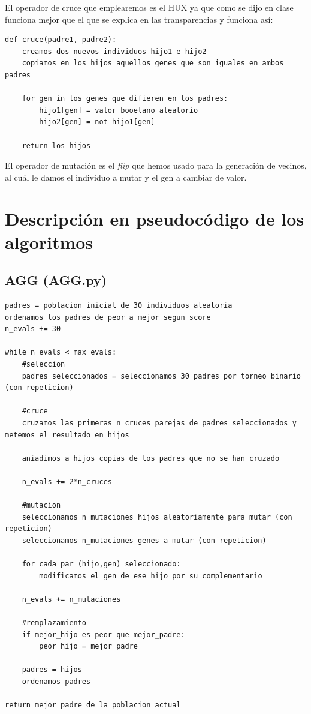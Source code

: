 \documentclass[10pt,a4paper]{article}
\begin{document}
El operador de cruce que emplearemos es el HUX ya que como se dijo en clase funciona mejor que el que se explica en las transparencias y funciona así:\\

\begin{lstlisting}
def cruce(padre1, padre2):
	creamos dos nuevos individuos hijo1 e hijo2
	copiamos en los hijos aquellos genes que son iguales en ambos padres
	
	for gen in los genes que difieren en los padres:
		hijo1[gen] = valor booelano aleatorio
		hijo2[gen] = not hijo1[gen]
		
	return los hijos		
\end{lstlisting}

El operador de mutación es el \textit{flip} que hemos usado para la generación de vecinos, al cuál le damos el individuo a mutar y el gen a cambiar de valor.\\

\newpage

\section{\color[rgb]{0.0,0.0,0.21}Descripción en pseudocódigo de los algoritmos}
\subsection{\color[rgb]{0.0,0.0,0.51}AGG (AGG.py)}

\begin{lstlisting}
padres = poblacion inicial de 30 individuos aleatoria
ordenamos los padres de peor a mejor segun score
n_evals += 30

while n_evals < max_evals:
	#seleccion
	padres_seleccionados = seleccionamos 30 padres por torneo binario (con repeticion)
	
	#cruce
	cruzamos las primeras n_cruces parejas de padres_seleccionados y metemos el resultado en hijos
	
	aniadimos a hijos copias de los padres que no se han cruzado
	
	n_evals += 2*n_cruces
	
	#mutacion
	seleccionamos n_mutaciones hijos aleatoriamente para mutar (con repeticion)
	seleccionamos n_mutaciones genes a mutar (con repeticion)
	
	for cada par (hijo,gen) seleccionado:
		modificamos el gen de ese hijo por su complementario
		
	n_evals += n_mutaciones
		
	#remplazamiento
	if mejor_hijo es peor que mejor_padre:
		peor_hijo = mejor_padre
		
	padres = hijos
	ordenamos padres
	
return mejor padre de la poblacion actual		
\end{lstlisting}
\end{document}
